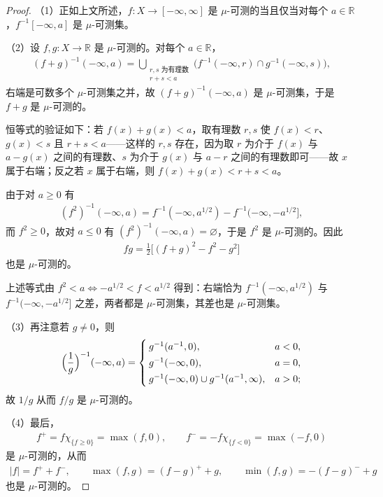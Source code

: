 \documentclass[../../main.tex]{subfiles}
\begin{document}
\begin{proof}
（1）正如上文所述，$f:X\to[-\infty,\infty]$ 是 $\mu$-可测的当且仅当对每个 $a\in\mathbb{R}$，$f^{-1}[-\infty,a]$ 是 $\mu$-可测集。%

（2）设 $f,g:X\to\mathbb{R}$ 是 $\mu$-可测的。对每个 $a\in\mathbb{R}$，
\begin{align*}
(f+g)^{-1}(-\infty,a)=\bigcup_{\substack{r,s\text{ 为有理数}\\ r+s<a}}\bigl(f^{-1}(-\infty,r)\cap g^{-1}(-\infty,s)\bigr),
\end{align*}
右端是可数多个 $\mu$-可测集之并，故 $(f+g)^{-1}(-\infty,a)$ 是 $\mu$-可测集，于是 $f+g$ 是 $\mu$-可测的。

恒等式的验证如下：若 $f(x)+g(x)<a$，取有理数 $r,s$ 使 $f(x)<r$、$g(x)<s$ 且 $r+s<a$——这样的 $r,s$ 存在，因为取 $r$ 为介于 $f(x)$ 与 $a-g(x)$ 之间的有理数、$s$ 为介于 $g(x)$ 与 $a-r$ 之间的有理数即可——故 $x$ 属于右端；反之若 $x$ 属于右端，则 $f(x)+g(x)<r+s<a$。

由于对 $a\geqslant0$ 有
\begin{align*}
(f^{2})^{-1}(-\infty,a)=f^{-1}(-\infty,a^{1/2})-f^{-1}(-\infty,-a^{1/2}],
\end{align*}
而 $f^{2}\geqslant0$，故对 $a\leqslant0$ 有 $(f^{2})^{-1}(-\infty,a)=\varnothing$，于是 $f^{2}$ 是 $\mu$-可测的。因此
\begin{align*}
fg=\frac{1}{2}\bigl[(f+g)^{2}-f^{2}-g^{2}\bigr]
\end{align*}
也是 $\mu$-可测的。

上述等式由 $f^{2}<a\iff -a^{1/2}<f<a^{1/2}$ 得到：右端恰为 $f^{-1}(-\infty,a^{1/2})$ 与 $f^{-1}(-\infty,-a^{1/2}]$ 之差，两者都是 $\mu$-可测集，其差也是 $\mu$-可测集。

（3）再注意若 $g\neq0$，则
\begin{align*}
\Bigl(\frac{1}{g}\Bigr)^{-1}(-\infty,a)=
\begin{cases}
g^{-1}(a^{-1},0), & a<0,\\[2pt]
g^{-1}(-\infty,0), & a=0,\\[2pt]
g^{-1}(-\infty,0)\cup g^{-1}(a^{-1},\infty), & a>0;
\end{cases}
\end{align*}
故 $1/g$ 从而 $f/g$ 是 $\mu$-可测的。

（4）最后，
\begin{align*}
f^{+}=f\chi_{\{f\geqslant0\}}=\max(f,0),\qquad f^{-}=-f\chi_{\{f<0\}}=\max(-f,0)
\end{align*}
是 $\mu$-可测的，从而
\begin{align*}
|f|=f^{+}+f^{-},\qquad\max(f,g)=(f-g)^{+}+g,\qquad\min(f,g)=-(f-g)^{-}+g
\end{align*}
也是 $\mu$-可测的。


\end{proof}
\end{document}
